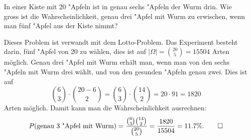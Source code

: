 In einer Kiste mit 20 "Apfeln ist in genau sechs "Apfeln der Wurm drin.
Wie gross ist die Wahrscheinlichkeit, genau drei "Apfel mit Wurm zu
erwischen, wenn man fünf "Apfel aus der Kiste nimmt?

\begin{loesung}
Dieses Problem ist verwandt mit dem Lotto-Problem.
Das Experiment besteht darin, fünf "Apfel von 20 zu wählen, dies ist auf
$|\Omega|=\binom{20}{5}=15504$ Arten möglich.
Genau drei "Apfel mit Wurm erhält man, wenn man von den sechs "Apfeln mit
Wurm drei wählt, und von den gesunden "Apfeln genau zwei. Dies ist auf
\[
\binom{6}{3}\cdot\binom{20-6}{2}
=
\binom{6}{3}\cdot\binom{14}{2}
=
20\cdot 91=1820
\]
Arten möglich. Damit kann man die Wahrscheinlichkeit ausrechnen:
\[
P(\text{genau 3 "Apfel mit Wurm})=\frac{\binom{6}{3}\binom{14}{2}}{\binom{20}{5}}
=\frac{1820}{15504}=11.7\%.
\qedhere
\]
\end{loesung}

